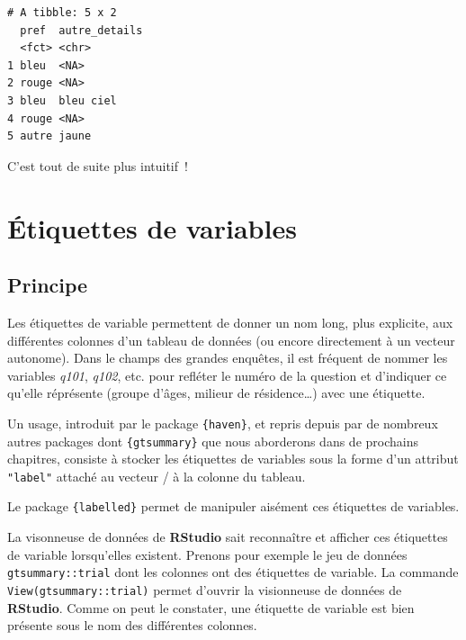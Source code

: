 \documentclass[
  letterpaper,
  DIV=11,
  numbers=noendperiod,
  oneside]{scrreprt}
\begin{document}
\begin{verbatim}
# A tibble: 5 x 2
  pref  autre_details
  <fct> <chr>        
1 bleu  <NA>         
2 rouge <NA>         
3 bleu  bleu ciel    
4 rouge <NA>         
5 autre jaune        
\end{verbatim}

C'est tout de suite plus intuitif~!

\hypertarget{sec-etiquettes-variables}{%
\chapter{Étiquettes de variables}\label{sec-etiquettes-variables}}

\hypertarget{principe}{%
\section{Principe}\label{principe}}

Les étiquettes de variable permettent de donner un nom long, plus
explicite, aux différentes colonnes d'un tableau de données (ou encore
directement à un vecteur autonome). Dans le champs des grandes enquêtes,
il est fréquent de nommer les variables \emph{q101}, \emph{q102}, etc.
pour refléter le numéro de la question et d'indiquer ce qu'elle
réprésente (groupe d'âges, milieur de résidence\ldots) avec une
étiquette.

Un usage, introduit par le package \texttt{\{haven\}}, et repris depuis
par de nombreux autres packages dont \texttt{\{gtsummary\}} que nous
aborderons dans de prochains chapitres, consiste à stocker les
étiquettes de variables sous la forme d'un attribut
\texttt{"label"} attaché au vecteur / à la colonne du tableau.

Le package \texttt{\{labelled\}} permet de manipuler aisément ces
étiquettes de variables.

La visonneuse de données de \textbf{RStudio} sait reconnaître et
afficher ces étiquettes de variable lorsqu'elles existent. Prenons pour
exemple le jeu de données \texttt{gtsummary::trial} dont les colonnes
ont des étiquettes de variable. La commande
\texttt{View(gtsummary::trial)} permet d'ouvrir la visionneuse de
données de \textbf{RStudio}. Comme on peut le constater, une étiquette
de variable est bien présente sous le nom des différentes colonnes.
\end{document}
